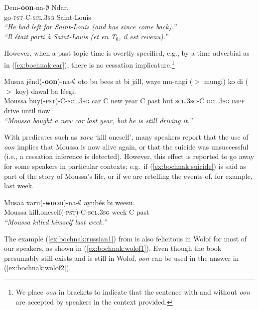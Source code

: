 \documentclass[output=paper]{langsci/langsci}
\begin{document}
\ea
\gll\label{leave2-rep}Dem\textbf{-oon}-na-$\emptyset$ Ndar.\\
go-\textsc{pst-C-scl.3sg} Saint-Louis\\
\glt \textit{``He had left for Saint-Louis (and has since come back).''}\\\textit{``Il \'etait parti \`a Saint-Louis (et en T$_0$,
  il est revenu).''} \hfill \citep[p.~279]{robert91approche}
\z

However, when a past topic time is overtly specified, e.g., by a time adverbial as in (\ref{ex:bochnak:car}), there is no cessation implicature.\footnote{We place \textit{oon} in brackets to indicate that the sentence with and without \textit{oon} are accepted by speakers in the context provided.}

\ea\label{ex:bochnak:car}
\gll Musaa j\"end(\textbf{-oon})-na-$\emptyset$ oto bu bees at bi j\'all, waye mu-{angi ($>$ mungi)} ko {di ($>$ koy)} dawal ba l\'eegi.\\
Moussa buy(-\textsc{pst})-C-\textsc{scl.3sg} car C new year C past but \textsc{scl.3sg}-C \textsc{ocl.3sg} \textsc{impf} drive until now\\
\glt \textit{``Moussa bought a new car last year, but he is still driving it.''} 
\z

With predicates such as \textit{xaru} `kill oneself', many speakers
report that the use of \textit{oon} implies that Moussa is now alive
again, or that the suicide was unsuccessful (i.e., a cessation
inference is detected). However, this effect is reported to go away
for some speakers in
particular contexts; e.g.~if
(\ref{ex:bochnak:suicide}) is said as part of the story of Moussa's life, or if
we are retelling the events of, for example, last week.

\ea\label{ex:bochnak:suicide}
\gll Musaa xaru(-\textbf{woon})-na-$\emptyset$ ayub\'es bi weesu.\\
Moussa kill.oneself\textsc{(-pst)-C-scl.3sg} week C past\\
\glt \textit{``Moussa killed himself last week.''}
\z

The example (\ref{ex:bochnak:russian1}) from \cite{klein94time} is also felicitous in Wolof for most
of our speakers, as shown in (\ref{ex:bochnak:wolof1}). Even though the book
presumably still exists and is still in Wolof,  \textit{oon} can be
used in the answer in (\ref{ex:bochnak:wolof2}).
\end{document}
